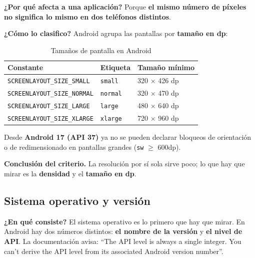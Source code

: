 \documentclass[11pt,a4paper]{article}
\newcommand{\code}[1]{\texttt{\color{ink}#1}}
\newcommand{\campo}[1]{\textbf{\color{ink}#1}}
\begin{document}
	\campo{¿Por qué afecta a una aplicación?}
	Porque \textbf{el mismo número de píxeles no significa lo mismo en dos teléfonos distintos}.
	
	\textbf{\color{primary}¿Cómo lo clasifico?}
	Android agrupa las pantallas por \textbf{tamaño en dp}:
	
	\begin{table}[htbp]
		\centering
		\small
		\begin{tabular}{@{}l l l@{}}
			\toprule
			\rowcolor{primary}
			\textcolor{paper}{\sffamily\bfseries Constante} & \textcolor{paper}{\sffamily\bfseries Etiqueta} & \textcolor{paper}{\sffamily\bfseries Tamaño mínimo} \\
			\midrule
			\code{SCREENLAYOUT\_SIZE\_SMALL} & \code{small} & 320 $\times$ 426 dp \\
			\rowcolor{soft}
			\code{SCREENLAYOUT\_SIZE\_NORMAL} & \code{normal} & 320 $\times$ 470 dp \\
			\code{SCREENLAYOUT\_SIZE\_LARGE} & \code{large} & 480 $\times$ 640 dp \\
			\rowcolor{soft}
			\code{SCREENLAYOUT\_SIZE\_XLARGE} & \code{xlarge} & 720 $\times$ 960 dp \\
			\bottomrule
		\end{tabular}
		\caption{Tamaños de pantalla en Android}
	\end{table}
	
	Desde \textbf{Android 17 (API 37)} ya no se pueden declarar bloqueos de orientación o de redimensionado en pantallas grandes (\code{sw} $\geq$ 600dp).
	
	\campo{Conclusión del criterio.} La resolución por sí sola sirve poco; lo que hay que mirar es la \textbf{densidad} y el \textbf{tamaño en dp}.
	
	\subsection{Sistema operativo y versión}
	
	\campo{¿En qué consiste?}
	El sistema operativo es lo primero que hay que mirar. En Android hay dos números distintos: \textbf{el nombre de la versión} y \textbf{el nivel de API}. La documentación avisa: \enquote{The API level is always a single integer. You can't derive the API level from its associated Android version number}.
	
\end{document}
